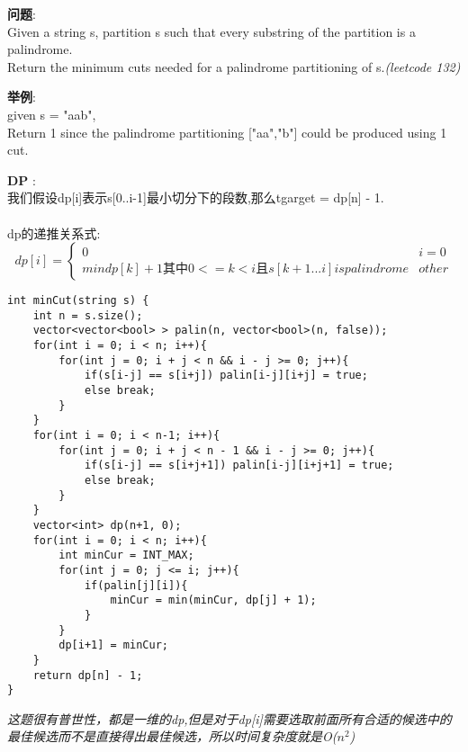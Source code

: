     
\begin{description}
    \item{\textbf{问题}}:\\
Given a string s, partition s such that every substring of the partition is a palindrome.\\
Return the minimum cuts needed for a palindrome partitioning of s.\textit{(leetcode 132)}

    \item{\textbf{举例}}:\\
given s = "aab", \\
Return 1 since the palindrome partitioning ["aa","b"] could be produced using 1 cut.
    \item{\textbf{DP}} : 
	\\我们假设dp[i]表示s[0..i-1]最小切分下的段数,那么tgarget = dp[n] - 1.\\
	\\dp的递推关系式:
$$
dp[i] =
\begin{cases} 
0 & i = 0 \\
min{dp[k] + 1  其中0 <= k < i 且 s[k+1...i] is palindrome} & other
\end{cases}
$$
    \begin{lstlisting}
int minCut(string s) {
	int n = s.size();
	vector<vector<bool> > palin(n, vector<bool>(n, false));
	for(int i = 0; i < n; i++){
		for(int j = 0; i + j < n && i - j >= 0; j++){
			if(s[i-j] == s[i+j]) palin[i-j][i+j] = true;
			else break;
		}
	}
	for(int i = 0; i < n-1; i++){
		for(int j = 0; i + j < n - 1 && i - j >= 0; j++){
			if(s[i-j] == s[i+j+1]) palin[i-j][i+j+1] = true;
			else break;
		}
	}
	vector<int> dp(n+1, 0);
	for(int i = 0; i < n; i++){
		int minCur = INT_MAX;
		for(int j = 0; j <= i; j++){
			if(palin[j][i]){
				minCur = min(minCur, dp[j] + 1);
			}
		}
		dp[i+1] = minCur;
	}
	return dp[n] - 1;
}
    \end{lstlisting}
	\textit{这题很有普世性，都是一维的dp,但是对于dp[i]需要选取前面所有合适的候选中的最佳候选而不是直接得出最佳候选，所以时间复杂度就是O($n^2$)}
\end{description}

